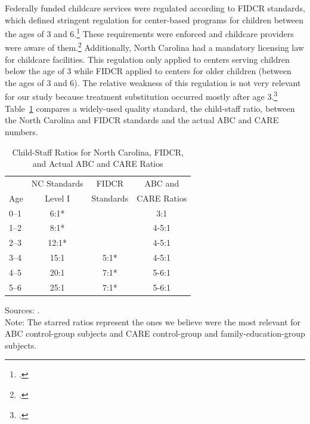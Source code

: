 \begin{appendices}
\noindent Federally funded childcare services were regulated according to FIDCR standards, which defined stringent regulation for center-based programs for children between the ages of 3 and 6.\footnote{\citet{Department-of-Health_1968_DayCareRequirements}.} These requirements were enforced and childcare providers were aware of them.\footnote{\citet{Kuperman_2015_Clifford-Russell-Interview}.} Additionally, North Carolina had a mandatory licensing law for childcare facilities. This regulation only applied to centers serving children below the age of 3 while FIDCR applied to centers for older children (between the ages of 3 and 6). The relative weakness of this regulation is not very relevant for our study because treatment substitution occurred mostly after age 3.\footnote{\citet{NCGA_1971_House-Bill-100}.} Table~\ref{table:staff} compares a widely-used quality standard, the child-staff ratio, between the North Carolina and FIDCR standards and the actual ABC and CARE numbers.

\begin{table}[H]
\caption{Child-Staff Ratios for North Carolina, FIDCR, and Actual ABC and CARE Ratios}
\label{table:staff}
\begin{threeparttable}
\begin{tabular}{lccc}
\toprule
 &NC Standards & FIDCR &  ABC and   \\
Age	& Level I &  Standards  & CARE Ratios\\ \midrule
0--1	& 6:1*	&  				& 	3:1					\\
1--2	& 8:1* 	& 				&   4-5:1				\\
2--3	& 12:1* & 				& 	4-5:1				\\
3--4	& 15:1 	& 		5:1*	& 	4-5:1 				\\
4--5	& 20:1 	& 		7:1*	& 	5-6:1 				\\
5--6 & 25:1  &		7:1*	&	5-6:1				\\
\bottomrule
\end{tabular}
\begin{tablenotes}
\footnotesize
Sources: \cite{Department-of-Health_1968_DayCareRequirements,NCGA_1971_House-Bill-100,Ramey-et-al_1977_Intro-to-ABC,Ramey_Campbell_1979_SR,Ramey_McGinness_etal_1982_Abecedarianapproach, Burchinal_Campbell_etal_1997_CD}.\\
Note: The starred ratios represent the ones we believe were the most relevant for ABC control-group subjects and CARE control-group and family-education-group subjects.
\end{tablenotes}
\end{threeparttable}
\end{table}


\end{appendices}
